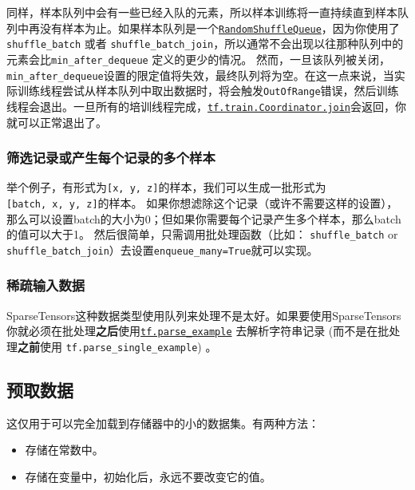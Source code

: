 同样，样本队列中会有一些已经入队的元素，所以样本训练将一直持续直到样本队列中再没有样本为止。如果样本队列是一个\href{../../api_docs/python/io_ops.md\#RandomShuffleQueue}{\texttt{RandomShuffleQueue}}，因为你使用了\texttt{shuffle\_batch}
或者
\texttt{shuffle\_batch\_join}，所以通常不会出现以往那种队列中的元素会比\texttt{min\_after\_dequeue}
定义的更少的情况。
然而，一旦该队列被关闭，\texttt{min\_after\_dequeue}设置的限定值将失效，最终队列将为空。在这一点来说，当实际训练线程尝试从样本队列中取出数据时，将会触发\texttt{OutOfRange}错误，然后训练线程会退出。一旦所有的培训线程完成，\href{../../api_docs/python/train.md\#Coordinator.join}{\texttt{tf.train.Coordinator.join}}会返回，你就可以正常退出了。

\subsubsection{筛选记录或产生每个记录的多个样本
}\label{ux7b5bux9009ux8bb0ux5f55ux6216ux4ea7ux751fux6bcfux4e2aux8bb0ux5f55ux7684ux591aux4e2aux6837ux672c}

举个例子，有形式为\texttt{{[}x,\ y,\ z{]}}的样本，我们可以生成一批形式为\texttt{{[}batch,\ x,\ y,\ z{]}}的样本。
如果你想滤除这个记录（或许不需要这样的设置），那么可以设置batch的大小为0；但如果你需要每个记录产生多个样本，那么batch的值可以大于1。
然后很简单，只需调用批处理函数（比如： \texttt{shuffle\_batch} or
\texttt{shuffle\_batch\_join}）去设置\texttt{enqueue\_many=True}就可以实现。

\subsubsection{稀疏输入数据
}\label{ux7a00ux758fux8f93ux5165ux6570ux636e}

SparseTensors这种数据类型使用队列来处理不是太好。如果要使用SparseTensors你就必须在批处理\textbf{之后}使用\href{../../api_docs/python/io_ops.md\#parse_example}{\texttt{tf.parse\_example}}
去解析字符串记录 (而不是在批处理\textbf{之前}使用
\texttt{tf.parse\_single\_example}) 。

\subsection{预取数据 }\label{ux9884ux53d6ux6570ux636e}

这仅用于可以完全加载到存储器中的小的数据集。有两种方法：

\begin{itemize}
\tightlist
\item
  存储在常数中。
\item
  存储在变量中，初始化后，永远不要改变它的值。
\end{itemize}

